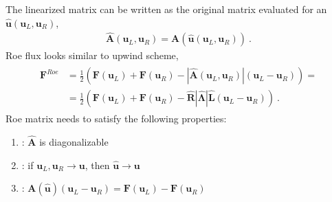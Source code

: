 \documentclass[letterpaper,10pt,english]{jupyterBook}
\begin{document}
\sphinxAtStartPar
{} The linearized matrix can be written as the original matrix evaluated for an  \(\hat{\mathbf{u}}(\mathbf{u}_L, \mathbf{u}_R)\),
\begin{equation*}
\begin{split}\hat{\mathbf{A}}(\mathbf{u}_L, \mathbf{u}_R) = \mathbf{A}(\hat{\mathbf{u}}(\mathbf{u}_L, \mathbf{u}_R)) \ .\end{split}
\end{equation*}
\sphinxAtStartPar
{} Roe flux looks similar to upwind scheme,
\begin{equation*}
\begin{split}\begin{aligned}
  \mathbf{F}^{Roe}
  & = \frac{1}{2} \left( \mathbf{F}(\mathbf{u}_L) + \mathbf{F}(\mathbf{u}_R) - \left| \hat{\mathbf{A}}(\mathbf{u}_L, \mathbf{u}_R) \right| (\mathbf{u}_L - \mathbf{u}_R) \right) = \\
  & = \frac{1}{2} \left( \mathbf{F}(\mathbf{u}_L) + \mathbf{F}(\mathbf{u}_R) - \hat{\mathbf{R}} \left| \hat{\boldsymbol{\Lambda}} \right| \hat{\mathbf{L}} (\mathbf{u}_L - \mathbf{u}_R) \right) \ .
\end{aligned}\end{split}
\end{equation*}
\sphinxAtStartPar
{} Roe matrix needs to satisfy the following properties:
\begin{enumerate}
%
\item {} 
\sphinxAtStartPar
{}: \(\hat{\mathbf{A}}\) is diagonalizable

\item {} 
\sphinxAtStartPar
{}: if \(\mathbf{u}_L, \mathbf{u}_R \rightarrow \mathbf{u}\), then \(\hat{\mathbf{u}} \rightarrow \mathbf{u}\)

\item {} 
\sphinxAtStartPar
{}: \(\mathbf{A}(\hat{\mathbf{u}}) \left( \mathbf{u}_L - \mathbf{u}_R \right) = \mathbf{F}(\mathbf{u}_L) - \mathbf{F}(\mathbf{u}_R)\)

\end{enumerate}
\label{ch/pde/fvm-hyperbolic-pde:example-0}
\end{document}
